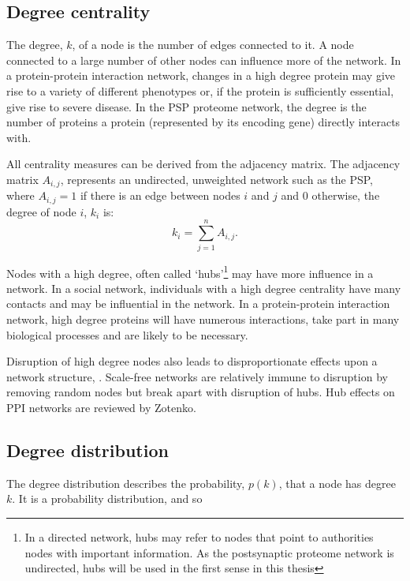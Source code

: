 \subsection{Degree centrality}
\label{sec:degree centrality}

The degree, $k$, of a node is the number of edges connected to it. A node connected to a large number of other nodes can influence more of the network. In a protein-protein interaction network, changes in a high degree protein may give rise to a variety of different phenotypes or, if the protein is sufficiently essential, give rise to severe disease.  In the PSP proteome network, the degree is the number of proteins a protein (represented by its encoding gene) directly interacts with.


All centrality measures can be derived from the adjacency matrix. The adjacency matrix $A_{i,j}$, represents an undirected, unweighted network such as the PSP,  where $A_{i,j}=1$  if there is an edge between nodes $i$ and $j$ and 0 otherwise, the degree of node $i$, $k_i$ is\cite{boccaletti2006complex}:
\begin{equation}
k_i = \sum_{j=1}^n A_{i,j}.
\label{Equation:Degree_from_adjacency}
\end{equation}

 Nodes with a high degree, often called `hubs'\cite{zhu2007getting}\footnote{In a directed network, hubs may refer to nodes that point to authorities nodes with important information. As the postsynaptic proteome network is undirected, hubs will be used in the first sense in this thesis\cite{kleinberg1999authoritative}} may have more influence in a network.  In a social network, individuals with a high degree centrality have many contacts and may be influential in the network. In a protein-protein interaction network, high degree proteins will have numerous interactions, take part in many biological processes and are likely to be necessary. 
 
 Disruption of high degree nodes also leads to disproportionate effects upon a network structure\cite{jeong2001lethality}, \cite{albert2000error}. Scale-free networks are relatively immune to disruption by removing random nodes but break apart with disruption of hubs. Hub effects on PPI networks are reviewed by Zotenko\cite{zotenko2008hubs}.


\subsection{Degree distribution}
\label{sec:degree distribution}
The degree distribution describes the probability, $p(k)$, that a  node has degree $k$. It is a probability distribution, and so

